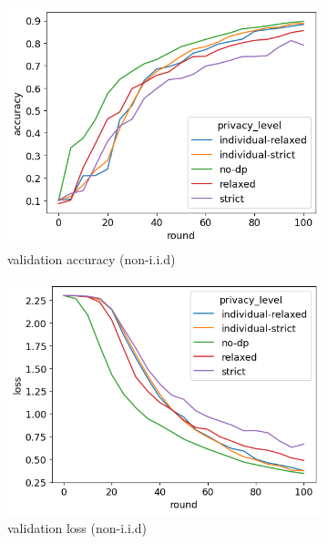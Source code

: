 \begin{figure}[h]
	\centering
	\begin{subfigure}{0.45\textwidth}
		\centering
		\includegraphics[width=\textwidth]{Bilder/emnist-accuracy.png}
		\caption{validation accuracy (non-i.i.d)}
	\end{subfigure}
	\begin{subfigure}{0.45\textwidth}
		\centering
		\includegraphics[width=\textwidth]{Bilder/emnist-loss.png}
		\caption{validation loss (non-i.i.d)}
	\end{subfigure}
	\begin{subfigure}{0.45\textwidth}
		\centering

\end{subfigure}
\end{figure}
